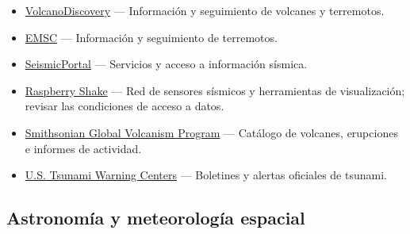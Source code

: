 \documentclass[
  letterpaper,
  DIV=11,
  numbers=noendperiod]{scrartcl}
\providecommand{\tightlist}{%
  \setlength{\itemsep}{0pt}\setlength{\parskip}{0pt}}
\begin{document}
\begin{itemize}
\tightlist
\item
  \href{https://volcanodiscovery.com/}{VolcanoDiscovery} --- Información
  y seguimiento de volcanes y terremotos.
\item
  \href{https://emsc-csem.org/}{EMSC} --- Información y seguimiento de
  terremotos.
\item
  \href{https://seismicportal.eu/}{SeismicPortal} --- Servicios y acceso
  a información sísmica.
\item
  \href{https://raspberryshake.org/}{Raspberry Shake} --- Red de
  sensores sísmicos y herramientas de visualización; revisar las
  condiciones de acceso a datos.
\item
  \href{https://volcano.si.edu/}{Smithsonian Global Volcanism Program}
  --- Catálogo de volcanes, erupciones e informes de actividad.
\item
  \href{https://tsunami.gov/}{U.S. Tsunami Warning Centers} ---
  Boletines y alertas oficiales de tsunami.
\end{itemize}

\subsection{Astronomía y meteorología
espacial}\label{astronomuxeda-y-meteorologuxeda-espacial}
\end{document}
